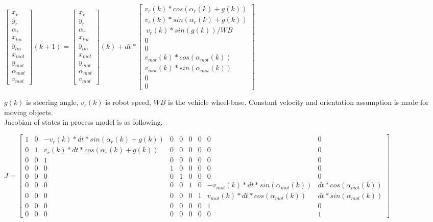 \documentclass[11pt,a4paper]{article}
\begin{document}
$\begin{bmatrix} x_{r} \\ y_{r} \\ \alpha_{r} \\ x_{lm} \\ y_{lm} \\  x_{mot} \\ y_{mot} \\ \alpha_{mot} \\ v_{mot} \end{bmatrix}(k+1) =
 \begin{bmatrix} x_{r} \\ y_{r} \\ \alpha_{r} \\ x_{lm} \\ y_{lm} \\  x_{mot} \\ y_{mot} \\ \alpha_{mot} \\ v_{mot} \end{bmatrix}(k)  + 
dt*\begin{bmatrix} v_{r}(k)*cos(\alpha_{r}(k) + g(k)) \\ v_{r}(k)*sin(\alpha_{r}(k) + g(k)) \\ \ v_{r}(k)*sin(g(k)) / WB \\ 0 \\ 0 \\ v_{mot}(k)*cos(\alpha_{mot}(k)) \\ v_{mot}(k)*sin(\alpha_{mot}(k))  \\ 0 \\ 0 \end{bmatrix} $

\noindent$g(k)$ is steering angle, $v_{r}(k)$ is robot speed, $WB$ is the vehicle wheel-base. Constant velocity and orientation assumption is made for moving objects.
\\

\noindent Jacobian of states in process model is as following.

\begin{adjustwidth}{ -2 cm}{}
\noindent $J=\begin{bmatrix}    1  &  0  &   -v_{r}(k)*dt*sin(\alpha_{r}(k) + g(k)) & 0 & 0 & 0 & 0 & 0 & 0 \\
						0  &  1  &   v_{r}(k)*dt*cos(\alpha_{r}(k) + g(k)) & 0 & 0 & 0 & 0 & 0 & 0 \\
						0  &  0  &   1   &  0 & 0 & 0 & 0 & 0 & 0 \\
						0  &  0  &   0   &  1 & 0 & 0 & 0 & 0 & 0 \\
						0  &  0  &   0   &  0 & 1 & 0 & 0 & 0 & 0 \\
						0  &  0  &   0   &  0 & 0 & 1 & 0 & -v_{mot}(k)*dt*sin(\alpha_{mot}(k)) &  dt*cos(\alpha_{mot}(k)) \\
						0  &  0  &   0   &  0 & 0 & 0 & 1 &  v_{mot}(k)*dt*cos(\alpha_{mot}(k)) & dt*sin(\alpha_{mot}(k)) \\
						0  &  0  &   0   &  0 & 0 & 0 & 0 & 1 & 0 \\
						0  &  0  &   0   &  0 & 0 & 0 & 0 & 0 & 1 
\end{bmatrix}$
\end{adjustwidth}
\end{document}
